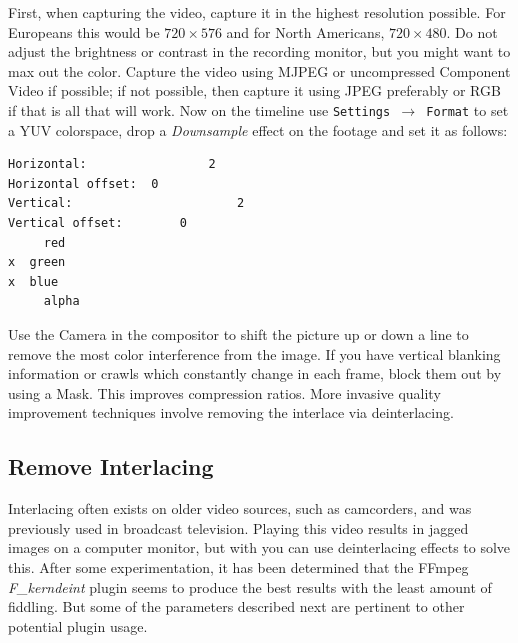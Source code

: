 First, when capturing the video, capture it in the highest resolution possible. For Europeans this would be $720\times576$ and for North Americans, $720\times480$. Do not adjust the brightness or contrast in the recording monitor, but you might want to max out the color. Capture the video using MJPEG or uncompressed Component Video if possible; if not possible, then capture it using JPEG preferably or RGB if that is all that will work.  Now on the timeline use \texttt{Settings $\rightarrow$ Format} to set a YUV colorspace, drop a \textit{Downsample} effect on the footage and set it as follows:

\begin{lstlisting}[numbers=none]
Horizontal:					2
Horizontal offset: 	0
Vertical:						2
Vertical offset: 		0
	 red
x  green
x  blue
	 alpha
\end{lstlisting}

Use the Camera in the compositor to shift the picture up or down a line to remove the most color interference from the image. If you have vertical blanking information or crawls which constantly change in each frame, block them out by using a Mask. This improves compression ratios.   More invasive quality improvement techniques involve removing the interlace via deinterlacing.

\subsection{Remove Interlacing}%
\label{sub:remove_interlacing}

Interlacing often exists on older video sources, such as camcorders, and was previously used in broadcast television. Playing this video results in jagged images on a computer monitor, but with \CGG{} you can use deinterlacing effects to solve this.  After some experimentation, it has been determined that the FFmpeg \textit{F\_kerndeint} plugin seems to produce the best results with the least amount of fiddling.  But some of the parameters described next are pertinent to other potential plugin usage.

